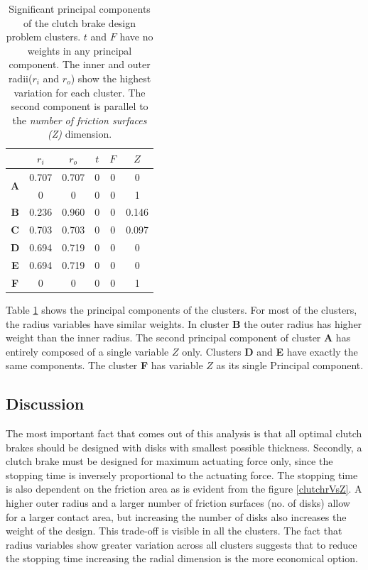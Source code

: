 \begin{table}[!ht]
  \centering
  \begin{tabular}{c|c|c|c|c|c|}
    \cline{2-6}
    & $r_{i}$ & $r_{o}$ & $ t $  & $F$ & $Z$ \\
    \hline
    \multicolumn{1}{|c|}{\multirow{2}{*}{\textbf{A}}} & 0.707 & 0.707 & 0 & 0 & 0\\ \cline{2-6}
    \multicolumn{1}{|c|}{}& 0 & 0 & 0 & 0 & 1\\
    \hline
    \multicolumn{1}{|c|}{\textbf{B}} & 0.236 & 0.960 & 0 & 0 & 0.146\\
    \hline
    \multicolumn{1}{|c|}{\textbf{C}} & 0.703 & 0.703 & 0 & 0 & 0.097\\
    \hline
    \multicolumn{1}{|c|}{\textbf{D}} & 0.694 & 0.719 & 0 & 0 & 0\\
    \hline
    \multicolumn{1}{|c|}{\textbf{E}} & 0.694 & 0.719 & 0 & 0 & 0\\
    \hline
    \multicolumn{1}{|c|}{\textbf{F}} & 0 & 0 & 0 & 0 & 1\\
    \hline
  \end{tabular}
  \caption{Significant principal components of the clutch brake design problem clusters. $t$ and $F$ have no weights in any principal component. The inner and outer radii($r_i$ and $r_o$) show the highest variation for each cluster. The second component is parallel to the {\em number of friction surfaces (Z)} dimension.}
  \label{first2clutchPCs}
\end{table}

Table \ref{first2clutchPCs} shows the principal components of the
clusters. For most of the clusters, the radius variables have similar
weights. In cluster \textbf{B} the outer radius has higher weight than the
inner radius.  The second principal component of cluster \textbf{A} has
entirely composed of a single variable $Z$ only. Clusters \textbf{D} and
\textbf{E} have exactly the same components. The cluster \textbf{F} has 
variable $Z$ as its single Principal component.

\subsection{Discussion}

The most important fact that comes out of this analysis is that all optimal
clutch brakes should be designed with disks with smallest possible
thickness.  Secondly, a clutch brake must be designed for maximum actuating
force only, since the stopping time is inversely proportional to the
actuating force. The stopping time is also dependent on the friction area
as is evident from the figure \ref{clutchrVsZ}. A higher outer radius and a
larger number of friction surfaces (no. of disks) allow for a larger
contact area, but increasing the number of disks also increases the weight
of the design.  This trade-off is visible in all the clusters. The fact
that radius variables show greater variation across all clusters suggests
that to reduce the stopping time increasing the radial dimension is the
more economical option.



